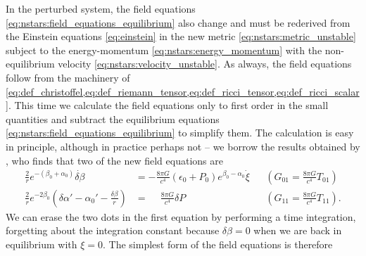 In the perturbed system, the field equations \eqref{eq:nstars:field_equations_equilibrium} also change and must be rederived from the Einstein equations \eqref{eq:einstein} in the new metric \eqref{eq:nstars:metric_unstable} subject to the energy-momentum \eqref{eq:nstars:energy_momentum} with the non-equilibrium velocity \eqref{eq:nstars:velocity_unstable}.
As always, the field equations follow from the machinery of \cref{eq:def_christoffel,eq:def_riemann_tensor,eq:def_ricci_tensor,eq:def_ricci_scalar}.
This time we calculate the field equations only to first order in the small quantities and subtract the equilibrium equations \eqref{eq:nstars:field_equations_equilibrium} to simplify them.
The calculation is easy in principle, although in practice perhaps not -- we borrow the results obtained by \cite[§26.4d]{ref:mtw}, who finds that two of the new field equations are
\begin{subequations}
\begin{align}
	\frac{2}{r} e^{-(\beta_0 + \alpha_0)} \dot{\delta\beta}                                     &= - \frac{8 \pi G}{c^4} (\epsilon_0 + P_0) e^{\beta_0 - \alpha_0} \dot\xi                         && \left( G_{01} = \frac{8 \pi G}{c^4} T_{01} \right)  \\
	\frac{2}{r} e^{-2\beta_0} \left( \delta\alpha' - \alpha_0' - \frac{\delta \beta}{r} \right) &= \phantom{-} \frac{8 \pi G}{c^4} \delta P                                                                    && \left( G_{11} = \frac{8 \pi G}{c^4} T_{11} \right) .
\end{align}
\end{subequations}
We can erase the two dots in the first equation by performing a time integration, forgetting about the integration constant because $\delta\beta=0$ when we are back in equilibrium with $\xi=0$.
The simplest form of the field equations is therefore

